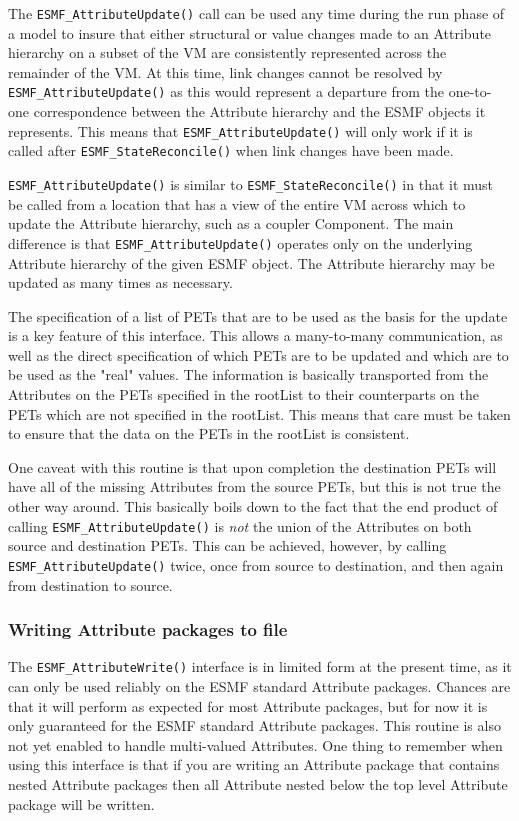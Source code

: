 The {\tt ESMF\_AttributeUpdate()} call can be used any time during the run phase of a model to insure that either structural or value changes made to an Attribute hierarchy on a subset of the VM are consistently represented across the remainder of the VM.  At this time, link changes cannot be resolved by {\tt ESMF\_AttributeUpdate()} as this would represent a departure from the one-to-one correspondence between the Attribute hierarchy and the ESMF objects it represents.  This means that {\tt ESMF\_AttributeUpdate()} will only work if it is called after {\tt ESMF\_StateReconcile()} when link changes have been made.  

{\tt ESMF\_AttributeUpdate()} is similar to {\tt ESMF\_StateReconcile()} in that it must be called from a location that has a view of the entire VM across which to update the Attribute hierarchy, such as a coupler Component.  The main difference is that {\tt ESMF\_AttributeUpdate()} operates only on the underlying Attribute hierarchy of the given ESMF object.  The Attribute hierarchy may be updated as many times as necessary.  

The specification of a list of PETs that are to be used as the basis for the update is a key feature of this interface.  This allows a many-to-many communication, as well as the direct specification of which PETs are to be updated and which are to be used as the "real" values.  The information is basically transported from the Attributes on the PETs specified in the rootList to their counterparts on the PETs which are not specified in the rootList.  This means that care must be taken to ensure that the data on the PETs in the rootList is consistent.

One caveat with this routine is that upon completion the destination PETs will have all of the missing Attributes from the source PETs, but this is not true the other way around.  This basically boils down to the fact that the end product of calling {\tt ESMF\_AttributeUpdate()} is {\it not} the union of the Attributes on both source and destination PETs.  This can be achieved, however, by calling {\tt ESMF\_AttributeUpdate()} twice, once from source to destination, and then again from destination to source.

\subsubsection{Writing Attribute packages to file}

The {\tt ESMF\_AttributeWrite()} interface is in limited form at the present time, as it can only be used reliably on the ESMF standard Attribute packages.  Chances are that it will perform as expected for most Attribute packages, but for now it is only guaranteed for the ESMF standard Attribute packages.  This routine is also not yet enabled to handle multi-valued Attributes.    One thing to remember when using this interface is that if you are writing an Attribute package that contains nested Attribute packages then all Attribute nested below the top level Attribute package will be written.

